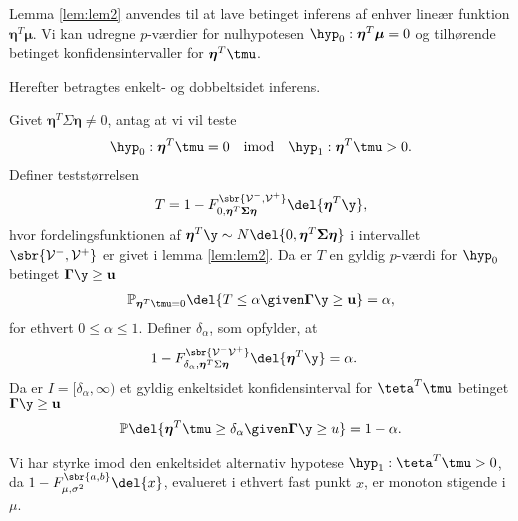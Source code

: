 %
Lemma \ref{lem:lem2} anvendes til at lave betinget inferens af enhver lineær funktion \(\boldsymbol{\eta}^T \boldsymbol{\mu}\).
Vi kan udregne \(p\)-værdier for nulhypotesen \(\hyp_0: \boldsymbol{\eta}^T \boldsymbol{\mu}=0\) og tilhørende betinget konfidensintervaller for \(\boldsymbol{\eta}^T \tmu\).

Herefter betragtes enkelt- og dobbeltsidet inferens.
%
\begin{lem} \label{lem:lem3}
Givet \(\boldsymbol{\eta}^T \Sigma \boldsymbol{\eta} \neq 0\), antag at vi vil teste
\begin{align*}
\hyp_0: \boldsymbol{\eta}^T \tmu=0 \quad \text{imod} \quad \hyp_1: \boldsymbol{\eta}^T \tmu > 0.
\end{align*}
Definer teststørrelsen
\begin{align}
T=1- F_{0, \boldsymbol{\eta}^T \boldsymbol{\Sigma} \boldsymbol{\eta}}^{\sbr{\mathcal{V}^-, \mathcal{V}^+}} \del{\boldsymbol{\eta}^T \y}, \label{eq:post_1.14}
\end{align}
hvor fordelingsfunktionen af \(\boldsymbol{\eta}^T \y \sim N \del{0,  \boldsymbol{\eta}^T \boldsymbol{\Sigma} \boldsymbol{\eta}}\) i intervallet \(\sbr{\mathcal{V}^-, \mathcal{V}^+}\) er givet i lemma \ref{lem:lem2}.
Da er \(T\) en gyldig \(p\)-værdi for \(\hyp_0\) betinget \(\boldsymbol{\Gamma} \y \geq \mathbf{u}\)
\begin{align}
\mathbb{P}_{\boldsymbol{\eta}^T \tmu=0} \del{T \leq \alpha \given \boldsymbol{\Gamma }\y \geq \mathbf{u}} = \alpha, \label{eq:post_1.15}
\end{align}
for ethvert \(0 \leq \alpha \leq 1\). 
Definer \(\delta_{\alpha}\), som opfylder, at
\begin{align}
1-F_{\delta_{\alpha}, \boldsymbol{\eta}^T \Sigma \boldsymbol{\eta}}^{\sbr{\mathcal{V}^- \mathcal{V}^+}} \del{\boldsymbol{\eta}^T \y} &= \alpha. \label{eq:post_1.16}
\end{align}
Da er \(I= [\delta_\alpha, \infty )\) et gyldig enkeltsidet konfidensinterval for \(\teta^T \tmu\) betinget \(\boldsymbol{\Gamma} \y \geq \mathbf{u}\)
\begin{align}
\mathbb{P} \del{\boldsymbol{\eta}^T \tmu \geq \delta_\alpha \given \boldsymbol{\Gamma} \y \geq u} = 1- \alpha. \label{eq:post_1.17}
\end{align}
\end{lem}
%
Vi har styrke imod den enkeltsidet alternativ hypotese \(\hyp_1 : \teta^T \tmu > 0\), da \(1-F_{\mu, \sigma^2}^{\sbr{a,b}} \del{x}\), evalueret i ethvert fast punkt \(x\), er monoton stigende i \(\mu\).
